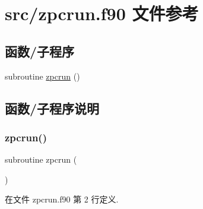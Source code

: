 \hypertarget{zpcrun_8f90}{}\section{src/zpcrun.f90 文件参考}
\label{zpcrun_8f90}
\subsection*{函数/子程序}
\begin{DoxyCompactItemize}
\item 
subroutine \mbox{\hyperlink{zpcrun_8f90_a6db1195600e087fc4a81495f3d7ed045}{zpcrun}} ()
\end{DoxyCompactItemize}


\subsection{函数/子程序说明}
\mbox{\label{zpcrun_8f90_a6db1195600e087fc4a81495f3d7ed045}} 
\subsubsection{\texorpdfstring{zpcrun()}{zpcrun()}}
{\footnotesize\ttfamily subroutine zpcrun (\begin{DoxyParamCaption}{ }\end{DoxyParamCaption})}



在文件 zpcrun.\+f90 第 2 行定义.

